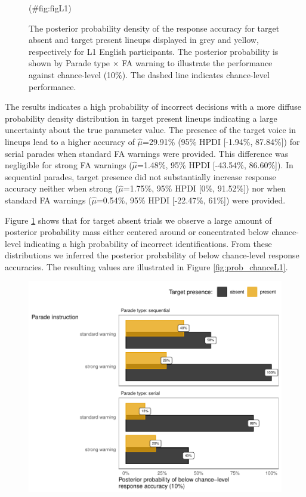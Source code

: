 \begin{appendix}
\begin{figure}[!ht]
{}

\caption{\label{fig:probdist2L1}The posterior probability density of the response accuracy for target absent and target present lineups displayed in grey and yellow, respectively for L1 English participants. The posterior probability is shown by Parade type $\times$ FA warning to illustrate the performance against chance-level (10\%). The dashed line indicates chance-level performance.}(\#fig:figL1)
\end{figure}

The results indicates a high probability of incorrect decisions with a
more diffuse probability density distribution in target present lineups
indicating a large uncertainty about the true parameter value. The
presence of the target voice in lineups lead to a higher accuracy of
\(\hat{\mu}\)=29.91\% (95\% HPDI {[}-1.94\%, 87.84\%{]}) for serial
parades when standard FA warnings were provided. This difference was
negligible for strong FA warnings (\(\hat{\mu}\)=1.48\%, 95\% HPDI
{[}-43.54\%, 86.60\%{]}). In sequential parades, target presence did not
substantially increase response accuracy neither when strong
(\(\hat{\mu}\)=1.75\%, 95\% HPDI {[}0\%, 91.52\%{]}) nor when standard
FA warnings (\(\hat{\mu}\)=0.54\%, 95\% HPDI {[}-22.47\%, 61\%{]}) were
provided.

Figure \ref{fig:probdist2L1} shows that for target absent trials we
observe a large amount of posterior probability mass either centered
around or concentrated below chance-level indicating a high probability
of incorrect identifications. From these distributions we inferred the
posterior probability of below chance-level response accuracies. The
resulting values are illustrated in Figure \ref{fig:prob_chanceL1}.

\begin{figure}[!ht]

{\centering \includegraphics{../plots/prob_below_chance_L1} 

}
\end{figure}
\end{appendix}
